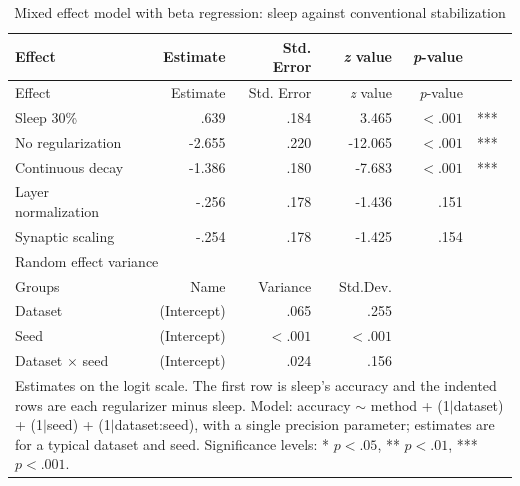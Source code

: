 {
\setlength{\tabcolsep}{10pt} %
\begin{longtable}{lrrrrl}
    \caption{Mixed effect model with beta regression: sleep against conventional stabilization \label{tab:betareg_baselines}}\\
    \toprule
    Effect  & Estimate & Std. Error & \textit{z} value & \textit{p}-value & \\
    \midrule
    \endfirsthead

    \toprule
    Effect  & Estimate & Std. Error & \textit{z} value & \textit{p}-value & \\
    \midrule
    \endhead
        Sleep 30\% & .639 & .184 & 3.465 & $<.001$ & ***\\
        \quad No regularization & -2.655 & .220 & -12.065 & $<.001$ & ***\\
        \quad Continuous decay & -1.386 & .180 & -7.683 & $<.001$ & ***\\
        \quad Layer normalization & -.256 & .178 & -1.436 & .151 & \\
        \quad Synaptic scaling & -.254 & .178 & -1.425 & .154 & \\
        \midrule
        \multicolumn{2}{l}{Random effect variance}\\
        Groups & Name & Variance & Std.Dev.& &\\
        Dataset & (Intercept) & .065 & .255 & &\\
        Seed & (Intercept) & $< .001$ & $< .001$ & &\\
        Dataset $\times$ seed & (Intercept) & .024 & .156 & &\\

        \bottomrule
    \multicolumn{6}{p{0.9\linewidth}}{\footnotesize Estimates on the logit scale. The first row is sleep's accuracy and the indented rows are each regularizer minus sleep. Model: accuracy $\sim$ method + (1$|$dataset) + (1$|$seed) + (1$|$dataset:seed), with a single precision parameter; estimates are for a typical dataset and seed. Significance levels: * $p<.05$, ** $p<.01$, *** $p<.001$.}\\
\end{longtable}
}
